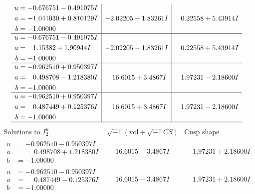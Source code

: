\documentclass[1p]{elsarticle_modified}
\theoremstyle{definition}
\newcommand{\I}{\sqrt{-1}}
\begin{document}
$$\begin{array}{c|c|c}
\begin{aligned}
u &= -0.676751 - 0.491075 I \\
a &= -1.041030 + 0.810129 I \\
b &= -1.00000\phantom{ +0.000000I}\end{aligned}
 & -2.02205 - 1.83261 I & \phantom{-}0.22558 + 5.43914 I \\ \hline\begin{aligned}
u &= -0.676751 - 0.491075 I \\
a &= \phantom{-}1.15382 + 1.90944 I \\
b &= -1.00000\phantom{ +0.000000I}\end{aligned}
 & -2.02205 - 1.83261 I & \phantom{-}0.22558 + 5.43914 I \\ \hline\begin{aligned}
u &= -0.962510 + 0.950397 I \\
a &= \phantom{-}0.498708 - 1.218380 I \\
b &= -1.00000\phantom{ +0.000000I}\end{aligned}
 & \phantom{-}16.6015 + 3.4867 I & \phantom{-}1.97231 - 2.18600 I \\ \hline\begin{aligned}
u &= -0.962510 + 0.950397 I \\
a &= \phantom{-}0.487449 + 0.125376 I \\
b &= -1.00000\phantom{ +0.000000I}\end{aligned}
 & \phantom{-}16.6015 + 3.4867 I & \phantom{-}1.97231 - 2.18600 I\\
 \hline 
 \end{array}$$\newpage$$\begin{array}{c|c|c}  
\text{Solutions to }I^u_{2}& \I (\text{vol} + \sqrt{-1}CS) & \text{Cusp shape}\\
 \hline 
\begin{aligned}
u &= -0.962510 - 0.950397 I \\
a &= \phantom{-}0.498708 + 1.218380 I \\
b &= -1.00000\phantom{ +0.000000I}\end{aligned}
 & \phantom{-}16.6015 - 3.4867 I & \phantom{-}1.97231 + 2.18600 I \\ \hline\begin{aligned}
u &= -0.962510 - 0.950397 I \\
a &= \phantom{-}0.487449 - 0.125376 I \\
b &= -1.00000\phantom{ +0.000000I}\end{aligned}
 & \phantom{-}16.6015 - 3.4867 I & \phantom{-}1.97231 + 2.18600 I \\ \hline\begin{aligned}

\end{aligned}
\end{array}$$
\end{document}
